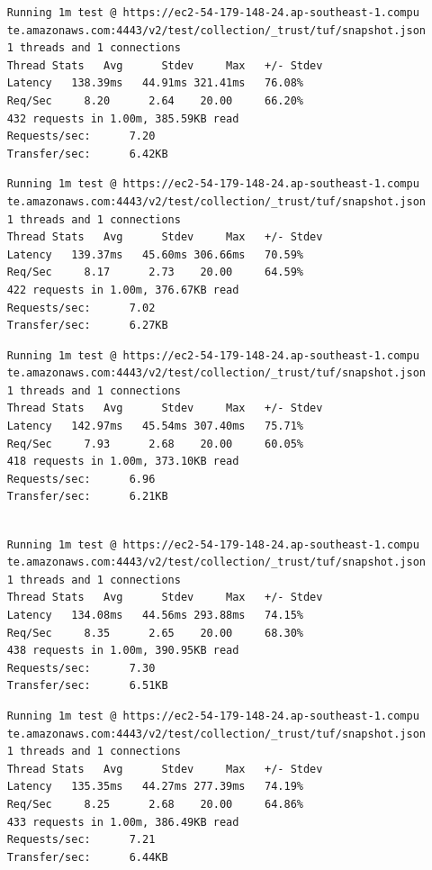 \documentclass[a4paper,12pt]{article}
\newcounter{subsubsubsection}[subsubsection]
\begin{document}
{{	
	\begin{verbatim}
	Running 1m test @ https://ec2-54-179-148-24.ap-southeast-1.compu
	te.amazonaws.com:4443/v2/test/collection/_trust/tuf/snapshot.json
	1 threads and 1 connections
	Thread Stats   Avg      Stdev     Max   +/- Stdev
	Latency   138.39ms   44.91ms 321.41ms   76.08%
	Req/Sec     8.20      2.64    20.00     66.20%
	432 requests in 1.00m, 385.59KB read
	Requests/sec:      7.20
	Transfer/sec:      6.42KB
	\end{verbatim}
	\begin{verbatim}
	Running 1m test @ https://ec2-54-179-148-24.ap-southeast-1.compu
	te.amazonaws.com:4443/v2/test/collection/_trust/tuf/snapshot.json
	1 threads and 1 connections
	Thread Stats   Avg      Stdev     Max   +/- Stdev
	Latency   139.37ms   45.60ms 306.66ms   70.59%
	Req/Sec     8.17      2.73    20.00     64.59%
	422 requests in 1.00m, 376.67KB read
	Requests/sec:      7.02
	Transfer/sec:      6.27KB
	\end{verbatim}
	\begin{verbatim}
	Running 1m test @ https://ec2-54-179-148-24.ap-southeast-1.compu
	te.amazonaws.com:4443/v2/test/collection/_trust/tuf/snapshot.json
	1 threads and 1 connections
	Thread Stats   Avg      Stdev     Max   +/- Stdev
	Latency   142.97ms   45.54ms 307.40ms   75.71%
	Req/Sec     7.93      2.68    20.00     60.05%
	418 requests in 1.00m, 373.10KB read
	Requests/sec:      6.96
	Transfer/sec:      6.21KB
	\end{verbatim}
	\begin{verbatim}
	
	Running 1m test @ https://ec2-54-179-148-24.ap-southeast-1.compu
	te.amazonaws.com:4443/v2/test/collection/_trust/tuf/snapshot.json
	1 threads and 1 connections
	Thread Stats   Avg      Stdev     Max   +/- Stdev
	Latency   134.08ms   44.56ms 293.88ms   74.15%
	Req/Sec     8.35      2.65    20.00     68.30%
	438 requests in 1.00m, 390.95KB read
	Requests/sec:      7.30
	Transfer/sec:      6.51KB
	\end{verbatim}
	\newpage
	\begin{verbatim}
	Running 1m test @ https://ec2-54-179-148-24.ap-southeast-1.compu
	te.amazonaws.com:4443/v2/test/collection/_trust/tuf/snapshot.json
	1 threads and 1 connections
	Thread Stats   Avg      Stdev     Max   +/- Stdev
	Latency   135.35ms   44.27ms 277.39ms   74.19%
	Req/Sec     8.25      2.68    20.00     64.86%
	433 requests in 1.00m, 386.49KB read
	Requests/sec:      7.21
	Transfer/sec:      6.44KB
	\end{verbatim}
	\newpage
	
}}
\end{document}
